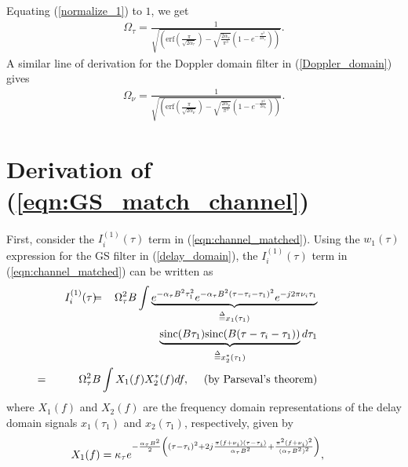 Equating (\ref{normalize_1}) to $1$, we get
\begin{align}
\Omega_{\tau}=\frac{1}{\sqrt{\left(\mathrm{erf}\left(\frac{\pi}{\sqrt{2\alpha_{\tau}}}\right)-\sqrt{\frac{2\alpha_{\tau}}{\pi^{3}}}\left(1-e^{-\frac{\pi^{2}}{2\alpha_{\tau}}}\right)\right)}}.
\label{Omega_tau}
\end{align}
A similar line of derivation for the Doppler domain filter in (\ref{Doppler_domain}) gives 
\begin{align}
\Omega_{\nu}=\frac{1}{\sqrt{\left(\mathrm{erf}\left(\frac{\pi}{\sqrt{2\alpha_{\nu}}}\right)-\sqrt{\frac{2\alpha_{\nu}}{\pi^{3}}}\left(1-e^{-\frac{\pi^{2}}{2\alpha_{\nu}}}\right)\right)}}.
\label{Omega_nu}
\end{align}

\section{Derivation of (\ref{eqn:GS_match_channel})}
\label{appxB}
First, consider the $I_{i}^{(1)}(\tau)$ term in (\ref{eqn:channel_matched}). 
Using the $w_1({\tau})$ expression for the GS filter in (\ref{delay_domain}), the  $I_{i}^{(1)}(\tau)$ term in (\ref{eqn:channel_matched}) can be written as
\begin{eqnarray}
\hspace{-8mm}
I_{i}^{(1)}(\tau) & \hspace{-2mm} = & \hspace{-2mm}  \Omega_{\tau}^{2}B\int \underbrace{e^{-\alpha_{\tau}B^{2}\tau_{1}^{2}}e^{-\alpha_{\tau}B^{2}(\tau-\tau_{i}-\tau_{1})^{2}}e^{-j2\pi\nu_{i}\tau_{1}}}_{\overset{\Delta}{=}x_{1}(\tau_{1})} \nonumber \\
& \hspace{-2mm} & \hspace{-2mm} \underbrace{\mathrm{sinc}(B\tau_{1})\mathrm{sinc}(B(\tau-\tau_{i}-\tau_{1}))}_{\overset{\Delta}{=}x_{2}^{*}(\tau_{1})}d\tau_{1} \nonumber \\
& \hspace{-20mm} = & \hspace{-11mm} \Omega_{\tau}^{2}B\int X_{1}(f)X_{2}^{*}(f)df, \ \ \ \text{ (by Parseval's theorem)}
\label{integral_1}
\end{eqnarray}
where $X_{1}(f)$ and $X_{2}(f)$ are the frequency domain representations of the delay domain signals $x_{1}(\tau_{1})$ and $x_{2}(\tau_{1})$, respectively, given by
\begin{equation}
\hspace{-4mm}
X_{1}(f)= \kappa_\tau 
e^{-\frac{\alpha_{\tau}B^{2}}{2}\left((\tau-\tau_i)^{2}+2j\frac{\pi(f+\nu_{i})(\tau-\tau_i)}{\alpha_{\tau}B^{2}}+\frac{\pi^{2}(f+\nu_{i})^{2}}{(\alpha_{\tau}B^{2})^{2}}\right)},
\end{equation}
